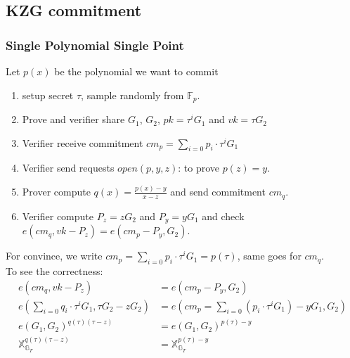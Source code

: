 \documentclass[10pt]{article}
\newcommand{\FField}{\mathbb{F}_p}
\begin{document}
\subsection{KZG commitment}
\subsubsection{Single Polynomial Single Point}
Let $p(x)$ be the polynomial we want to commit
\begin{enumerate}
    \item setup secret $\tau$, sample randomly from $\FField$.
    \item Prove and verifier share $G_1$, $G_2$, $pk = \tau^iG_1$ and $vk = \tau G_2$
    \item Verifier receive commitment ${cm}_p = \sum_{i=0}p_i \cdot \tau^iG_1$ 
    \item Verifier send requests $open(p, y, z)$: to prove $p(z) = y$.
    \item Prover compute $q(x) = \frac{p(x) - y}{x-z}$ and send commitment
        ${cm}_q$.
    \item Verifier compute $P_z = zG_2$ and $P_y = yG_1$ and check 
        $e({cm}_q, vk-P_z) = e({cm}_p-P_y, G_2)$.
\end{enumerate}
For convince, we write $cm_{p} = \sum_{i=0}p_i \cdot \tau^iG_1 = p(\tau)$, same
goes for ${cm}_q$.\\
To see the correctness:
\[
\begin{aligned}
    e({cm}_q, vk-P_z) &= e({cm}_p-P_y, G_2)\\
    e(\sum_{i=0}q_i \cdot \tau^iG_1, \tau G_2-z G_2) &= e({cm}_p =
    \sum_{i=0}(p_i \cdot \tau^iG_1)-yG_1, G_2)\\
    e(G_1, G_2)^{q(\tau)(\tau - z)} &= e(G_1,G_2)^{p(\tau)-y}\\
    \mathbb{X}^{q(\tau)(\tau - z)}_{\mathbb{G}_T} &= \mathbb{X}^{p(\tau) - y}_{\mathbb{G}_T}
\end{aligned}
\]
\end{document}
